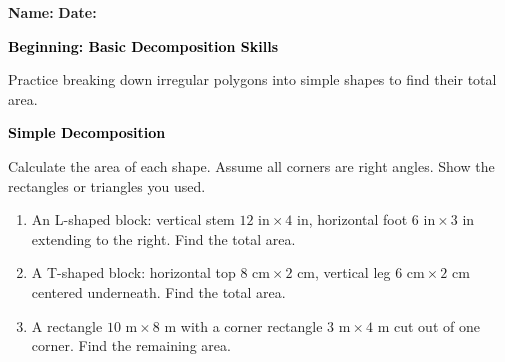 \documentclass[12pt, letterpaper, fleqn]{article}
\begin{document}
\textbf{Name:} \underline{\hspace{5cm}}
\hfill
\textbf{Date:} \underline{\hspace{3cm}}\\

\begin{tcolorbox}[colback=black!10]
    \large\textcolor{black}{\textbf{Beginning: Basic Decomposition Skills}}
\end{tcolorbox}

\vspace{3mm}

\noindent
Practice breaking down irregular polygons into simple shapes to find their total area.

\vspace{4mm}

\begin{tcolorbox}[colback=black!10]
\large\textcolor{black}{\textbf{Simple Decomposition}}
\end{tcolorbox}

\noindent
Calculate the area of each shape. Assume all corners are right angles. Show the rectangles or triangles you used.

\vspace{3mm}

\begin{enumerate}[itemsep=1.5cm, leftmargin=0.6cm]

\item An L-shaped block: vertical stem $12\text{ in} \times 4\text{ in}$, horizontal foot $6\text{ in} \times 3\text{ in}$ extending to the right. Find the total area.

\vspace{2cm}

\item A T-shaped block: horizontal top $8\text{ cm} \times 2\text{ cm}$, vertical leg $6\text{ cm} \times 2\text{ cm}$ centered underneath. Find the total area.

\vspace{2cm}

\item A rectangle $10\text{ m} \times 8\text{ m}$ with a corner rectangle $3\text{ m} \times 4\text{ m}$ cut out of one corner. Find the remaining area.

\vspace{2cm}

\end{enumerate}
\end{document}
